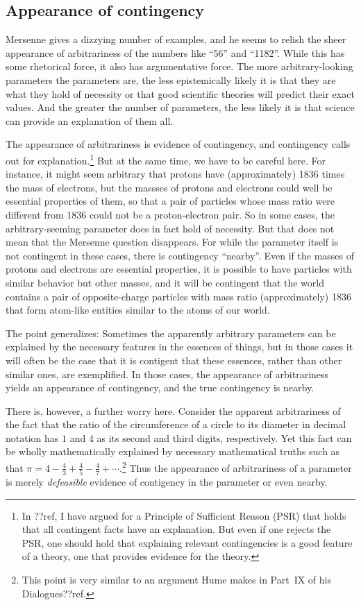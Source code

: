 \subsection{Appearance of contingency}
Mersenne gives a dizzying number of examples, and he seems to relish the sheer appearance of arbitrariness of the numbers like ``56''
and ``1182''. While this has some rhetorical force, it also has argumentative force. The more arbitrary-looking parameters
the parameters are, the less epistemically likely it is that they are what they hold of necessity or that good scientific theories
will predict their exact values. And the greater the number of parameters, the less likely it is that science can provide 
an explanation of them all.

The appearance of arbitrariness is evidence of contingency, and contingency calls out for explanation.\footnote{In ??ref, I have
argued for a Principle of Sufficient Reason (PSR) that holds that all contingent facts have an explanation. But even if one rejects
the PSR, one should hold that explaining relevant contingencies is a good feature of a theory, one that provides evidence for the
theory.} But at the 
same time, we have to be careful here. For instance,
it might seem arbitrary that protons have (approximately) 1836 times the mass of electrons, but the massses of protons and
electrons could well be essential properties of them, so that a pair of particles whose mass ratio were different from 1836 could 
not be a proton-electron pair.  So in some cases, the arbitrary-seeming parameter does in fact hold of necessity. But that does not
mean that the Mersenne question disappears. For while the parameter itself is not contingent in these cases, there is contingency
``nearby''. Even if the masses of protons and electrons are essential properties, it is possible to have particles with similar
behavior but other masses, and it will be contingent that the world contains a pair of opposite-charge particles with mass ratio 
(approximately) 1836 that form atom-like entities similar to the atoms of our world. 

The point generalizes: Sometimes the apparently arbitrary parameters can be explained by the necessary features in the essences of
things, but in those cases it will often be the case that it is contigent that these essences, rather than other similar ones, are
exemplified. In those cases, the appearance of arbitrariness yields an appearance of contingency, and the true contingency is 
nearby.

There is, however, a further worry here. Consider the apparent arbitrariness of the fact that the ratio of the circumference of
a circle to its diameter in decimal notation has $1$ and $4$ as its second and third digits, respectively. Yet this fact can 
be wholly mathematically explained by necessary mathematical truths such as that $\pi=4-\frac43+\frac45-\frac47+\cdots$.\footnote{This 
point is very similar to an argument Hume makes in Part~IX of his Dialogues??ref.} Thus the appearance of arbitrariness of a parameter is merely
\textit{defeasible} evidence of contigency in the parameter or even nearby. 

